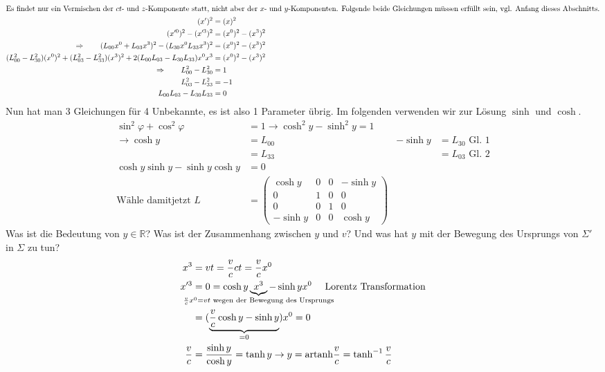 \documentclass[oneside]{book}
\theoremstyle{definition}
\newcommand{\vp}{\varphi}
\renewcommand{\Re}{\mathbb{R}}
\begin{document}
\begin{align*}
\intertext{Es findet nur ein Vermischen der $ct$- und $z$-Komponente statt, nicht aber der $x$- und $y$-Komponenten. Folgende beide Gleichungen müssen erfüllt sein, vgl. Anfang dieses Abschnitts.}
(x')^2 &= (x)^2\\
(x'^0)^2 - (x'^3)^2 &= (x^0)^2 - (x^3)^2\\
\Rightarrow \qquad (L_{00}x^0 + L_{03}x^3)^2 - (L_{30} x^0 L_{33}x^3)^2 &= (x^0)^2 - (x^3)^2\\
(L_{00}^2-L_{30}^2)(x^0)^2 + (L_{03}^2 - L_{33}^2)(x^3)^2 + 2(L_{00}L_{03} - L_{30} L_{33})x^0 x^3 &= (x^0)^2 - (x^3)^2\\
\Rightarrow \qquad L_{00}^2 - L_{30}^2 &= 1\\
L_{03}^2 - L_{33}^2 &= -1\\
L_{00}L_{03} - L_{30}L_{33} &= 0
\end{align*}
Nun hat man 3 Gleichungen für 4 Unbekannte, es ist also 1 Parameter übrig. Im folgenden verwenden wir zur Lösung $\sinh$ und $\cosh$.
\begin{align*}
\sin^2 \vp + \cos^2\vp &= 1 \rightarrow \cosh^2 y - \sinh^2 y = 1\\
\rightarrow \cosh y &= L_{00}  & -\sinh y &= L_{30} \text{~Gl. 1}\\
&= L_{33} &  &= L_{03} \text{~Gl. 2}\\
\cosh y \sinh y - \sinh y \cosh y &= 0\\
\text{Wähle  damitjetzt~}
L &= \begin{pmatrix}
\cosh y & 0 & 0 & - \sinh y\\
0 & 1 & 0 & 0\\
0 & 0 & 1 & 0\\
-\sinh y & 0 & 0 & \cosh y 
\end{pmatrix}
\end{align*}
Was ist die Bedeutung von $y \in \Re$? Was ist der Zusammenhang zwischen $y$ und $v$? Und was hat $y$ mit der Bewegung des Ursprungs von $\Sigma'$ in $\Sigma$ zu tun?
\begin{align*}
x^3 &= v t = \frac{v}{c} c t = \frac{v}{c} x^0\\
x'^3 &= 0 = \cosh y \underbrace{x^3}_{\text{\hspace{-10em}}\frac{v}{c} x^0 = v t \text{~wegen der Bewegung des Ursprungs}\text{\hspace{-10em}}} - \sinh y x^0 \text{~~~~Lorentz Transformation}\\
&= (\underbrace{\frac{v}{c} \cosh y - \sinh y}_{=0})x^0 = 0\\
\frac{v}{c} &= \frac{\sinh y}{\cosh y} = \tanh y \rightarrow y = \text{artanh}\frac{v}{c} = \tanh^{-1} \frac{v}{c}
\end{align*}
\end{document}
